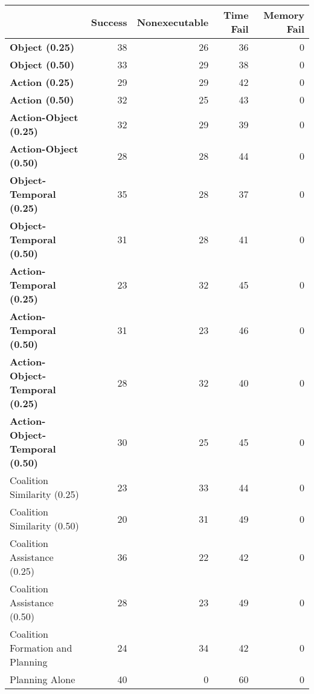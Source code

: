 \begin{tabular}{lrrrr}
\hline
                                        &   Success &   Nonexecutable &   Time Fail &   Memory Fail \\
\hline
 \textbf{Object (0.25)}                 &        38 &              26 &          36 &             0 \\
 \textbf{Object (0.50)}                 &        33 &              29 &          38 &             0 \\
 \textbf{Action (0.25)}                 &        29 &              29 &          42 &             0 \\
 \textbf{Action (0.50)}                 &        32 &              25 &          43 &             0 \\
 \textbf{Action-Object (0.25)}          &        32 &              29 &          39 &             0 \\
 \textbf{Action-Object (0.50)}          &        28 &              28 &          44 &             0 \\
 \textbf{Object-Temporal (0.25)}        &        35 &              28 &          37 &             0 \\
 \textbf{Object-Temporal (0.50)}        &        31 &              28 &          41 &             0 \\
 \textbf{Action-Temporal (0.25)}        &        23 &              32 &          45 &             0 \\
 \textbf{Action-Temporal (0.50)}        &        31 &              23 &          46 &             0 \\
 \textbf{Action-Object-Temporal (0.25)} &        28 &              32 &          40 &             0 \\
 \textbf{Action-Object-Temporal (0.50)} &        30 &              25 &          45 &             0 \\
 Coalition Similarity (0.25)            &        23 &              33 &          44 &             0 \\
 Coalition Similarity (0.50)            &        20 &              31 &          49 &             0 \\
 Coalition Assistance (0.25)            &        36 &              22 &          42 &             0 \\
 Coalition Assistance (0.50)            &        28 &              23 &          49 &             0 \\
 Coalition Formation and Planning       &        24 &              34 &          42 &             0 \\
 Planning Alone                         &        40 &               0 &          60 &             0 \\
\hline
\end{tabular}
